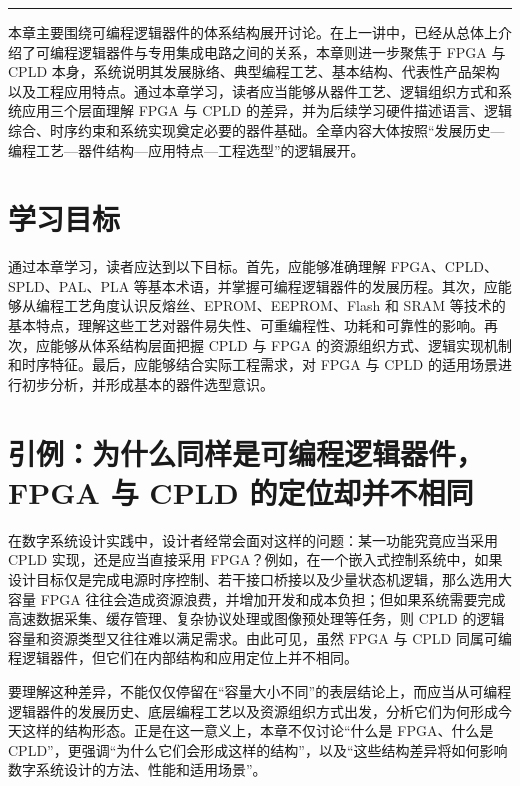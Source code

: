 \begin{center}\rule{0.5\linewidth}{0.5pt}\end{center}

本章主要围绕可编程逻辑器件的体系结构展开讨论。在上一讲中，已经从总体上介绍了可编程逻辑器件与专用集成电路之间的关系，本章则进一步聚焦于
FPGA 与 CPLD
本身，系统说明其发展脉络、典型编程工艺、基本结构、代表性产品架构以及工程应用特点。通过本章学习，读者应当能够从器件工艺、逻辑组织方式和系统应用三个层面理解
FPGA 与 CPLD
的差异，并为后续学习硬件描述语言、逻辑综合、时序约束和系统实现奠定必要的器件基础。全章内容大体按照``发展历史---编程工艺---器件结构---应用特点---工程选型''的逻辑展开。

\section{学习目标}\label{ux5b66ux4e60ux76eeux6807}

通过本章学习，读者应达到以下目标。首先，应能够准确理解
FPGA、CPLD、SPLD、PAL、PLA
等基本术语，并掌握可编程逻辑器件的发展历程。其次，应能够从编程工艺角度认识反熔丝、EPROM、EEPROM、Flash
和 SRAM
等技术的基本特点，理解这些工艺对器件易失性、可重编程性、功耗和可靠性的影响。再次，应能够从体系结构层面把握
CPLD 与 FPGA
的资源组织方式、逻辑实现机制和时序特征。最后，应能够结合实际工程需求，对
FPGA 与 CPLD 的适用场景进行初步分析，并形成基本的器件选型意识。

\section{引例：为什么同样是可编程逻辑器件，FPGA 与 CPLD
的定位却并不相同}\label{ux5f15ux4f8bux4e3aux4ec0ux4e48ux540cux6837ux662fux53efux7f16ux7a0bux903bux8f91ux5668ux4ef6fpga-ux4e0e-cpld-ux7684ux5b9aux4f4dux5374ux5e76ux4e0dux76f8ux540c}

在数字系统设计实践中，设计者经常会面对这样的问题：某一功能究竟应当采用
CPLD 实现，还是应当直接采用
FPGA？例如，在一个嵌入式控制系统中，如果设计目标仅是完成电源时序控制、若干接口桥接以及少量状态机逻辑，那么选用大容量
FPGA
往往会造成资源浪费，并增加开发和成本负担；但如果系统需要完成高速数据采集、缓存管理、复杂协议处理或图像预处理等任务，则
CPLD 的逻辑容量和资源类型又往往难以满足需求。由此可见，虽然 FPGA 与 CPLD
同属可编程逻辑器件，但它们在内部结构和应用定位上并不相同。

要理解这种差异，不能仅仅停留在``容量大小不同''的表层结论上，而应当从可编程逻辑器件的发展历史、底层编程工艺以及资源组织方式出发，分析它们为何形成今天这样的结构形态。正是在这一意义上，本章不仅讨论``什么是
FPGA、什么是
CPLD''，更强调``为什么它们会形成这样的结构''，以及``这些结构差异将如何影响数字系统设计的方法、性能和适用场景''。

